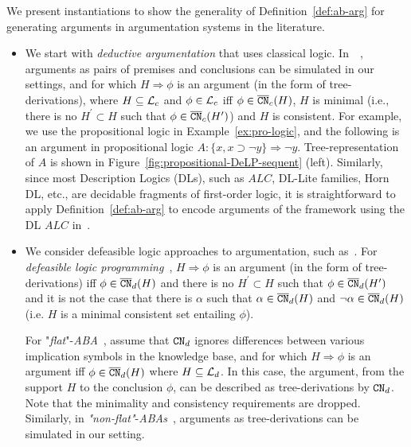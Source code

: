 

We present instantiations to show the generality of Definition~\ref{def:ab-arg} for generating arguments in argumentation systems in the literature.

\begin{itemize}
\item We start with \emph{deductive argumentation} that uses classical logic. In~~\cite{BesnardH01}, arguments as pairs of premises and conclusions can be simulated in our settings, and for which $H \Rightarrow \phi$ is an argument (in the form of tree-derivations), where $H \subseteq \mathcal{L}_c$ and $\phi \in \mathcal{L}_c$ iff $\phi \in \overline{\texttt{\textup{CN}}}_{c}(H)$, $H$ is minimal (i.e., there is no $H^{\prime} \subset H$ such that $\phi \in \overline{\texttt{\textup{CN}}}_{c}(H^{\prime})$) and $H$ is consistent. 
For example, we use the propositional logic in Example~\ref{ex:pro-logic}, and the following is an argument in propositional logic $A : \{x, x \supset \neg y \} \Rightarrow \neg y$. Tree-representation of $A$ is shown in Figure~\ref{fig:propositional-DeLP-sequent} (left).
Similarly, since most Description Logics (DLs), such as $ALC$, DL-Lite families, Horn DL, etc.,  are decidable fragments of first-order logic, it is straightforward to apply Definition~\ref{def:ab-arg} to encode arguments of the framework using the DL $ALC$ in~\cite{ZhangL13}.

\item We consider defeasible logic approaches to argumentation, such as~\cite{Dung2009,DimopoulosD0R0W24,Rapberger2024,Lehtonen2024,Alejandro2014}. 
For \emph{defeasible logic programming}~\cite{Alejandro2014}, $H \Rightarrow \phi$ is an argument (in the form of tree-derivations) iff $\phi \in \overline{\texttt{\textup{CN}}}_d(H)$ and there is no $H^{\prime} \subset H$ such that $\phi \in \overline{\texttt{\textup{CN}}}_d(H^{\prime})$ and it is not the case that there is $\alpha$ such that $\alpha \in \overline{\texttt{\textup{CN}}}_d(H)$ and $\neg \alpha \in \overline{\texttt{\textup{CN}}}_d(H)$ (i.e. $H$ is a minimal consistent set entailing $\phi$).


For "\emph{flat}"-\emph{ABA}~\cite{Dung2009,DimopoulosD0R0W24}, assume that $\texttt{\textup{CN}}_d$ ignores differences between various implication symbols in the knowledge base, and for which $H \Rightarrow \phi$ is an argument iff $\phi \in \overline{\texttt{\textup{CN}}}_d(H)$ where $H \subseteq \mathcal{L}_{d}$. In this case, the argument, from the support $H$ to the conclusion $\phi$,
can be described as tree-derivations by $\texttt{\textup{CN}}_d$.
Note that the minimality and consistency requirements are dropped. 
Similarly, in \emph{"non-flat"}-\emph{ABAs}~\cite{Rapberger2024,Lehtonen2024}, arguments as tree-derivations can be simulated in our setting.


\end{itemize}
